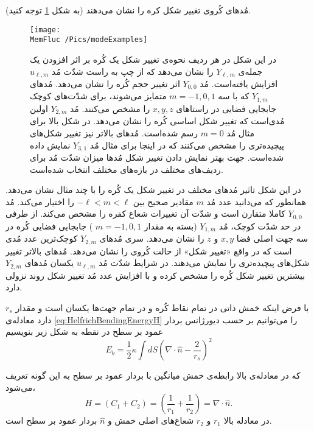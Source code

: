 مُد‌های کُروی تغییر شکل کره را نشان می‌دهند (به شکل 
\ref{fig:ulmExamples}
توجه کنید).
\begin{figure}[h]
\begin{center}
\texttt{[image: \\MemFluc /Pics/modeExamples]}
\caption{
در این شکل در هر ردیف نحوه‌ی تغییر شکل یک کُره بر اثر افزودن یک جمله‌ی 
$Y_{\ell,m}$
را نشان می‌دهد که از چپ به راست شدّت مُد
$u_{\ell,m}$
افزایش یافته‌است. مُد‌ 
$Y_{0,0}$
اثر تغییر حجم کُره را نشان می‌دهد. مُد‌های 
$Y_{1,m}$
که با سه 
$m=-1,0,1$
متمایز می‌شوند، برای شدّت‌های کوچک جابجایی فضایی در راستا‌های 
$x,y,z$
را مشخص می‌کنند. مُد
$Y_{2,m}$
اولین مُدی‌است که تغییر شکل اساسی کُره را نشان می‌دهد. در شکل بالا برای مثال مُد
$m=0$
رسم شده‌است. مُدهای بالاتر نیز تغییر شکل‌های پیچیده‌تری را مشخص می‌کنند که در اینجا برای مثال مُد 
$Y_{3,1}$
نمایش داده شده‌است. جهت بهتر نمایش دادن تغییر شکل مُدها میزان شدّت مُد برای ردیف‌های مختلف در بازه‌های مختلف انتخاب شده‌است.
}
\label{fig:ulmExamples}
\end{center}
\end{figure}

در این شکل تاثیر مُدهای مختلف در تغییر شکل یک کُره را با چند مثال نشان می‌دهد. همانطور که می‌دانید عدد مُد 
$m$
مقادیر صحیح بین 
$-\ell<m<\ell$
را اختیار می‌کند.  مُد
$Y_{0,0}$
کاملا متقارن است و شدّت آن تغییرات شعاع کفره را مشخص می‌کند. از طرفی در حد شدّت کوچک، مُد 
$Y_{1,m}$
(بسته به مقدار 
$m=-1,0,1$
) جابجایی فضایی کُره در سه جهت اصلی فضا 
$x,y$
و
$z$
را نشان می‌دهد. سری مُدهای 
$Y_{2,m}$
کوچک‌ترین عدد مُدی است که در واقع «تغییر شکل» از حالت کُروی را نشان می‌دهد. مُدهای بالاتر تغییر شکل‌های پیچیده‌تری را نمایش می‌دهند. در شرایط شدّت مُد
$u_{\ell,m}$
یکسان مُدهای
$Y_{2,m}$
بیشترین تغییر شکل کُره را مشخص کرده و با افزایش عدد مُد تغییر شکل روند نزولی دارد.


با فرض اینکه خمش ذاتی در تمام نقاط کُره و در تمام جهت‌ها یکسان است و مقدار 
$r_s$
دارد معادله‌ی
\ref{eq:HelfrichBendingEnergyH}
را می‌توانیم بر حسب دیورژانس بردار عمود بر سطح در نقطه به شکل زیر بنویسیم
\cite{safran1983}
\begin{equation}
E_{b}=\frac{1}{2}\kappa\int dS\left(\nabla\cdot\hat n-\frac{2}{r_s}\right)^2
\label{eq:ebforsubstitution}
\end{equation}

که در معادله‌ی بالا رابطه‌ی خمش میانگین با بردار عمود بر سطح به این گونه تعریف می‌شود،
\begin{equation}
H=(C_1+C_2)=\left(\frac{1}{r_1}+\frac{1}{r_2}\right)=\nabla\cdot\hat n.
\end{equation}
‌ در معادله بالا
$r_1$ و $r_2$
شعاع‌های اصلی خمش
و $\hat n$ بردار عمود بر سطح است.

